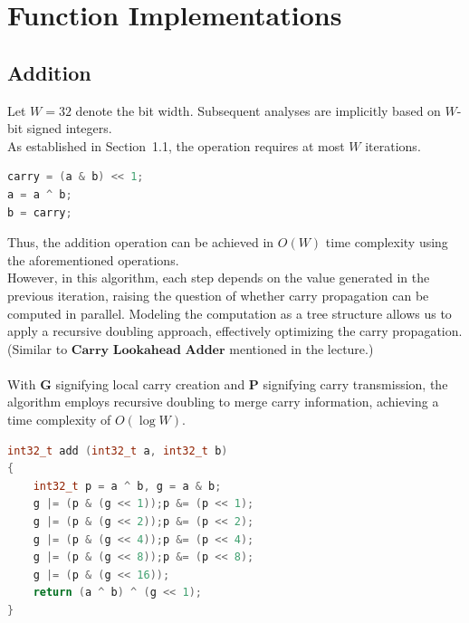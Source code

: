 \documentclass[11pt]{article}
\begin{document}
\section{Function Implementations}
\subsection{Addition}

Let $W=32$ denote the bit width. Subsequent analyses are implicitly based on $W$-bit signed integers.
\vspace{3pt}\\
As established in Section~1.1, the operation requires at most $W$ iterations.
\vspace{3pt}
\begin{lstlisting}[language=C++]
carry = (a & b) << 1;
a = a ^ b;
b = carry;
\end{lstlisting}
\vspace{8pt}
Thus, the addition operation can be achieved in $O(W)$ time complexity using the aforementioned operations.
\vspace{5pt}\\
However, in this algorithm, each step depends on the value generated in the previous iteration, raising the question of whether carry propagation can be computed in parallel. Modeling the computation as a tree structure allows us to apply a recursive doubling approach, effectively optimizing the carry propagation. (Similar to $\textbf{Carry Lookahead Adder}$ mentioned in the lecture.)
\vspace{10pt}\\
\resizebox{\textwidth}{!}{}
\vspace{10pt}\\
With \textbf{G} signifying local carry creation and \textbf{P} signifying carry transmission, the algorithm employs recursive doubling to merge carry information, achieving a time complexity of $O(\log W)$.
\vspace{3pt}
\begin{lstlisting}[language=C++]
int32_t add (int32_t a, int32_t b)
{
    int32_t p = a ^ b, g = a & b;
    g |= (p & (g << 1));p &= (p << 1);
    g |= (p & (g << 2));p &= (p << 2);
    g |= (p & (g << 4));p &= (p << 4);
    g |= (p & (g << 8));p &= (p << 8);
    g |= (p & (g << 16)); 
    return (a ^ b) ^ (g << 1);
}
\end{lstlisting}
\newpage
\end{document}
